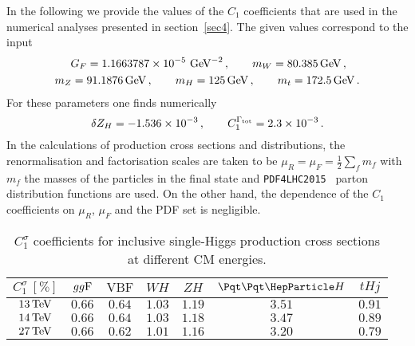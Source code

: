 In the following we provide the values of the $C_1$ coefficients that are used in the numerical analyses presented in section~\ref{sec4}. The given values correspond to the input 
\begin{equation}
\begin{split}
& \hspace{0.5cm}  G_F = 1.1663787\times  10^{-5}~{\rm GeV}^{-2} \,, \qquad  m_W = 80.385 \, {\rm GeV} \, , \\ 
& m_Z = 91.1876 \, {\rm GeV}\,, \qquad m_H = 125 \, {\rm GeV}\, , \qquad m_t = 172.5 \, {\rm GeV} \,.
\end{split}
\end{equation}
For these parameters one finds numerically~\cite{Degrassi:2016wml} 
\begin{equation}
\delta Z_H = -1.536\times 10^{-3} \,, \qquad C_1^{\Gamma_{\rm tot}} = 2.3 \times 10^{-3} \,.
\end{equation}
In the calculations of production cross sections and distributions, the renormalisation and factorisation scales are taken to be $ \mu_R = \mu_F = \frac{1}{2} \sum_f m_f$ with $m_f$ the masses of the particles in the final state and   {\tt PDF4LHC2015}~\cite{Butterworth:2015oua}  parton distribution functions are used. On the other hand, the dependence of the $C_1$ coefficients on $ \mu_R$,  $\mu_F$ and the PDF set is negligible.

\begin{table}[t!]
\begin{center}
\begin{tabular}{|c |c| c| c| c| c| c|}
\hline
$C_1^{\sigma}~[\%]$	& ${gg{\rm F}}$ &
${\text{VBF}} $ &  ${WH}$ & ${ZH}$ &
${\tth}$ &  ${tHj}$ \\ 
\hline \hline
$13 \, {\rm TeV}$ & $0.66$ & $0.64$  & $1.03$ & $1.19$ & $3.51$ & $0.91$ \\ \hline
$14 \, {\rm TeV}$ & $0.66$ & $0.64$  & $1.03$ & $1.18$ & $3.47$ & $0.89$ \\ \hline
$27 \, {\rm TeV}$ & $0.66$ & $0.62$  & $1.01$ & $1.16$ & $3.20$ & $0.79$ \\
 \hline
\end{tabular}
\end{center}
\caption{$C_1^{\sigma}$ coefficients for inclusive single-Higgs production cross sections at different CM energies.}
\label{c1s}
\end{table}
 
